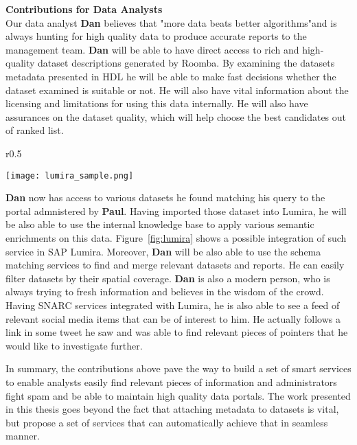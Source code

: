 \textbf{Contributions for Data Analysts}
\vspace{1mm}\\

Our data analyst \textbf{Dan} believes that "more data beats better algorithms"and is always hunting for high quality data to produce accurate reports to the management team. \textbf{Dan} will be able to have direct access to rich and high-quality dataset descriptions generated by Roomba. By examining the datasets metadata presented in HDL he will be able to make fast decisions whether the dataset examined is suitable or not. He will also have vital information about the licensing and limitations for using this data internally. He will also have assurances on the dataset quality, which will help choose the best candidates out of ranked list.
\begin{wrapfigure}{r}{0.5\textwidth}
  \begin{center}
    \texttt{[image: lumira\_sample.png]}
  \end{center}
  \caption{UI Prototype of semantic data enrichment in SAP Lumira}
  \label{fig:lumira}
\end{wrapfigure}
\textbf{Dan} now has access to various datasets he found matching his query to the portal admnistered by \textbf{Paul}. Having imported those dataset into Lumira, he will be also able to use the internal knowledge base to apply various semantic enrichments on this data. Figure~\ref{fig:lumira} shows a possible integration of such service in SAP Lumira. Moreover, \textbf{Dan} will be also able to use the schema matching services to find and merge relevant datasets and reports. He can easily filter datasets by their spatial coverage. \textbf{Dan} is also a modern person, who is always trying to fresh information and believes in the wisdom of the crowd. Having SNARC services integrated with Lumira, he is also able to see a feed of relevant social media items that can be of interest to him. He actually follows a link in some tweet he saw and was able to find relevant pieces of pointers that he would like to investigate further.


In summary, the contributions above pave the way to build a set of smart services to enable analysts easily find relevant pieces of information and administrators fight spam and be able to maintain high quality data portals. The work presented in this thesis goes beyond the fact that attaching metadata to datasets is vital, but propose a set of services that can automatically achieve that in seamless manner.

